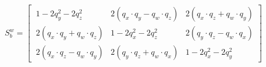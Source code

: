 \documentclass[preview]{standalone}
\begin{document}
\begin{center}
$S_b^w= \begin{bmatrix}\
                1-2q_y^2-2q_z^2  & 2(q_x\cdot q_y-q_w\cdot q_z) & 2(q_x\cdot q_z + q_w\cdot q_y) \\\
                2(q_x\cdot q_y + q_w\cdot q_z)  & 1-2q_x^2-2q_z^2 & 2(q_y\cdot q_z - q_w\cdot q_x)\\\
                2(q_x\cdot q_z - q_w\cdot q_y)  & 2(q_y\cdot q_z + q_w\cdot q_x) & 1-2q_x^2-2q_y^2\
            \end{bmatrix}$
\end{center}
\end{document}
